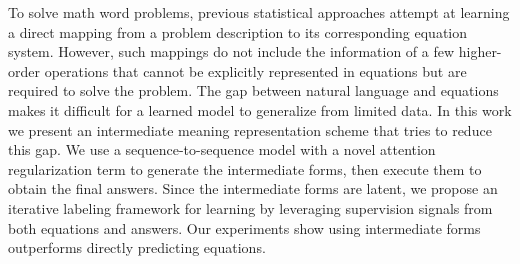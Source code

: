 To solve math word problems, previous statistical approaches attempt at learning a direct mapping from a problem description to its corresponding equation system. However, such mappings do not include the information of a few higher-order operations that cannot be explicitly represented in equations but are required to solve the problem. The gap between natural language and equations makes it difficult for a learned model to generalize from limited data. In this work we present an intermediate meaning representation scheme that tries to reduce this gap. We use a sequence-to-sequence model with a novel attention regularization term to generate the intermediate forms, then execute them to obtain the final answers. Since the intermediate forms are latent, we propose an iterative labeling framework for learning by leveraging supervision signals from both equations and answers. Our experiments show using intermediate forms outperforms directly predicting equations.

